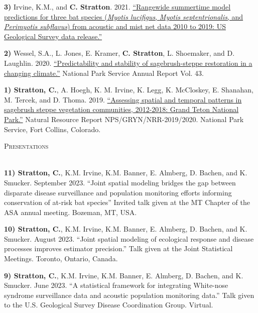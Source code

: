 \documentclass[a4paper]{article}
\newcommand{\lineunder} {
	\vspace*{-8pt} \\
	\hspace*{-18pt} \hrulefill \\
}
\newcommand{\header} [1] {
	{\hspace*{-18pt}\vspace*{6pt} \textcolor{Cerulean}{\textsc{#1}}}
	\vspace*{-6pt} \textcolor{Cerulean}{\lineunder}
}
\begin{document}
\textbf{3)} Irvine, K.M., and \textbf{C. Stratton}. 2021.
\href{https://doi.org/10.5066/P9XZ8D6N.}{``Rangewide summertime model
predictions for three bat species (\textit{Myotis lucifigus},
\textit{Myotis septentrionalis}, and \textit{Perimyotis subflavus}) from
acoustic and mist net data 2010 to 2019: US Geological Survey data
release.''} \vspace*{2mm}

\textbf{2)} Wessel, S.A., L. Jones, E. Kramer, \textbf{C. Stratton}, L.
Shoemaker, and D. Laughlin. 2020.
\href{https://journals.uwyo.edu/index.php/uwnpsrc/article/view/6791/6301}{``Predictability
and stability of sagebrush-steppe restoration in a changing climate.''}
National Park Service Annual Report Vol. 43. \vspace*{2mm}

\textbf{1) Stratton, C.}, A. Hoegh, K. M. Irvine, K. Legg, K. McCloskey,
E. Shanahan, M. Tercek, and D. Thoma. 2019.
\href{https://irma.nps.gov/DataStore/DownloadFile/631136}{``Assessing
spatial and temporal patterns in sagebrush steppe vegetation
communities, 2012-2018: Grand Teton National Park.''} Natural Resource
Report NPS/GRYN/NRR-2019/2020. National Park Service, Fort Collins,
Colorado. \vspace*{2mm}

\header{Presentations}
\vspace*{2mm}

\textbf{11) Stratton, C.}, K.M. Irvine, K.M. Banner, E. Almberg, D.
Bachen, and K. Smucker. September 2023. ``Joint spatial modeling bridges
the gap between disparate disease surveillance and population monitoring
efforts informing conservation of at-risk bat species'' Invited talk
given at the MT Chapter of the ASA annual meeting. Bozeman, MT, USA.
\vspace*{2mm}

\textbf{10) Stratton, C.}, K.M. Irvine, K.M. Banner, E. Almberg, D.
Bachen, and K. Smucker. August 2023. ``Joint spatial modeling of
ecological response and disease processes improves estimator
precision.'' Talk given at the Joint Statistical Meetings. Toronto,
Ontario, Canada. \vspace*{2mm}

\textbf{9) Stratton, C.}, K.M. Irvine, K.M. Banner, E. Almberg, D.
Bachen, and K. Smucker. June 2023. ``A statistical framework for
integrating White-nose syndrome surveillance data and acoustic
population monitoring data.'' Talk given to the U.S. Geological Survey
Disease Coordination Group. Virtual. \vspace*{2mm}
\end{document}
